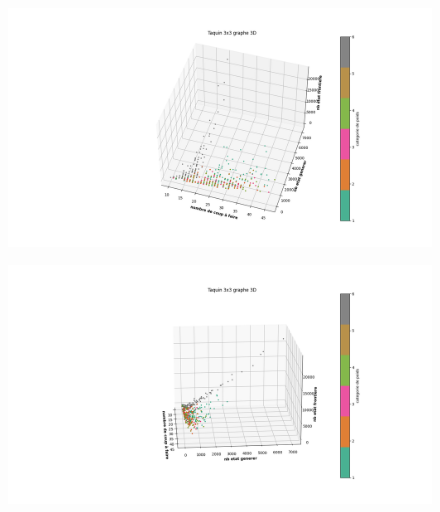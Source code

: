 \documentclass[a4paper, 12pt]{article}
\begin{document}
\begin{figure}[H]
    \centering
    \includegraphics[width=\textwidth]{graphe 3d Taquin 3x3(2)}
\end{figure}
\begin{figure}[H]
    \centering
    \includegraphics[width=\textwidth]{graphe 3d Taquin 3x3(3)}
\end{figure}
\end{document}
